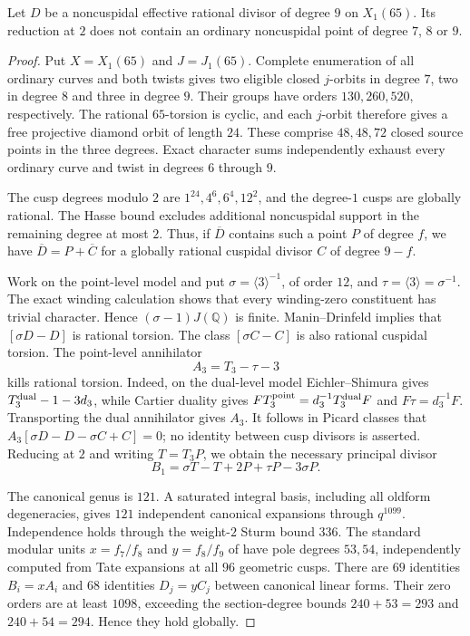 \begin{proposition}\label{prop:nonic65-ordinary-reduction}
Let $D$ be a noncuspidal effective rational divisor of degree $9$ on $X_1(65)$. Its reduction at $2$ does not contain an ordinary noncuspidal point of degree $7$, $8$ or $9$.
\end{proposition}
\begin{proof}
Put $X=X_1(65)$ and $J=J_1(65)$. Complete enumeration of all ordinary curves and both twists gives two eligible closed $j$-orbits in degree $7$, two in degree $8$ and three in degree $9$. Their groups have orders $130,260,520$, respectively. The rational $65$-torsion is cyclic, and each $j$-orbit therefore gives a free projective diamond orbit of length $24$. These comprise $48,48,72$ closed source points in the three degrees. Exact character sums independently exhaust every ordinary curve and twist in degrees $6$ through $9$.

The cusp degrees modulo $2$ are $1^{24},4^6,6^4,12^2$, and the degree-$1$ cusps are globally rational. The Hasse bound excludes additional noncuspidal support in the remaining degree at most $2$. Thus, if $\overline D$ contains such a point $P$ of degree $f$, we have $\overline D=P+\overline C$ for a globally rational cuspidal divisor $C$ of degree $9-f$.

Work on the point-level model and put $\sigma=\langle3\rangle^{-1}$, of order $12$, and $\tau=\langle3\rangle=\sigma^{-1}$. The exact winding calculation shows that every winding-zero constituent has trivial character. Hence $(\sigma-1)J(\mathbb Q)$ is finite. Manin--Drinfeld implies that $[\sigma D-D]$ is rational torsion. The class $[\sigma C-C]$ is also rational cuspidal torsion. The point-level annihilator
\[
 A_3=T_3-\tau-3
\]
kills rational torsion. Indeed, on the dual-level model Eichler--Shimura gives $T_3^{\rm dual}-1-3d_3$, while Cartier duality gives $F T_3^{\rm point}=d_3^{-1}T_3^{\rm dual}F$ and $F\tau=d_3^{-1}F$. Transporting the dual annihilator gives $A_3$. It follows in Picard classes that $A_3[\sigma D-D-\sigma C+C]=0$; no identity between cusp divisors is asserted. Reducing at $2$ and writing $T=T_3P$, we obtain the necessary principal divisor
\[
 B_1=\sigma T-T+2P+\tau P-3\sigma P.
\]

The canonical genus is $121$. A saturated integral basis, including all oldform degeneracies, gives $121$ independent canonical expansions through $q^{1099}$. Independence holds through the weight-$2$ Sturm bound $336$. The standard modular units $x=f_7/f_8$ and $y=f_8/f_9$ of \cite[Sections~2 and~2.1]{DvH} have pole degrees $53,54$, independently computed from Tate expansions at all $96$ geometric cusps. There are $69$ identities $B_i=xA_i$ and $68$ identities $D_j=yC_j$ between canonical linear forms. Their zero orders are at least $1098$, exceeding the section-degree bounds $240+53=293$ and $240+54=294$. Hence they hold globally.


\end{proof}
